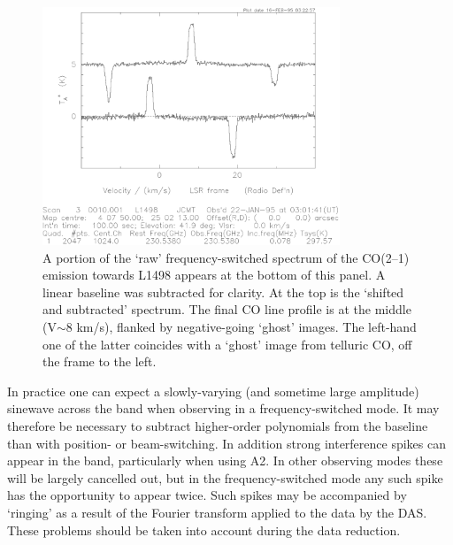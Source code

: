 \documentclass[11pt,twoside]{article}
\begin{document}
\begin{figure}[htb]
\centering
\includegraphics[width=3.5in]{sc8_fsw_reduction.ps}
\vspace*{-0.5cm}
\begin{center}
\begin{minipage}[t]{5.5in}
\caption[Reducing frequency-switched data]
{\small{A portion of the `raw' frequency-switched spectrum of the CO(2--1)
emission towards L1498 appears at the bottom of this panel. A linear baseline
was subtracted for clarity. At the top is the `shifted and subtracted'
spectrum. The final CO line profile is at the middle (V$\sim 8$ km/s), flanked
by negative-going `ghost' images. The left-hand one of the latter coincides
with a `ghost' image from telluric CO, off the frame to the left.
}}
\label{fig:fsw_reduction}
\end{minipage}
\end{center}
\end{figure}

In practice one can expect a slowly-varying (and sometime large
amplitude) sinewave across the band when observing in a
frequency-switched mode. It may therefore be necessary to subtract
higher-order polynomials from the baseline than with position- or
beam-switching. In addition strong interference spikes can appear in
the band, particularly when using A2. In other observing modes these
will be largely cancelled out, but in the frequency-switched mode any
such spike has the opportunity to appear twice. Such spikes may be
accompanied by `ringing' as a result of the Fourier transform applied
to the data by the DAS. These problems should be taken into account
during the data reduction.
\end{document}
